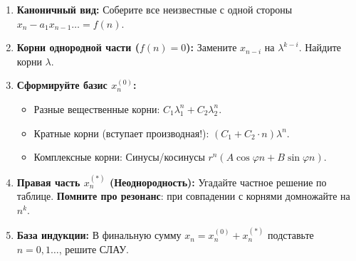 \documentclass[12pt,a4paper]{article}
\begin{document}
\vspace{0.6cm}
\begin{tcolorbox}[colback=yellow!5, colframe=orange!80!black, title=\textbf{Шпаргалка Олимпиадника: Алгоритм решения}, fonttitle=\bfseries]
\begin{enumerate}
    \item \textbf{Каноничный вид:} Соберите все неизвестные с одной стороны $x_n - a_1 x_{n-1} \dots = f(n)$.
    \item \textbf{Корни однородной части ($f(n)=0$):} Замените $x_{n-i}$ на $\lambda^{k-i}$. Найдите корни $\lambda$.
    \item \textbf{Сформируйте базис $x_n^{(0)}$:}
    \begin{itemize}
        \item Разные вещественные корни: $C_1 \lambda_1^n + C_2 \lambda_2^n$.
        \item Кратные корни (вступает производная!): $(C_1 + C_2 \cdot n) \lambda^n$.
        \item Комплексные корни: Синусы/косинусы $r^n (A \cos \varphi n + B \sin \varphi n)$.
    \end{itemize}
    \item \textbf{Правая часть $x_n^{(*)}$ (Неоднородность):} Угадайте частное решение по таблице. \textbf{Помните про резонанс}: при совпадении с корнями домножайте на $n^k$.
    \item \textbf{База индукции:} В финальную сумму $x_n = x_n^{(0)} + x_n^{(*)}$ подставьте $n=0, 1 \dots$, решите СЛАУ.
\end{enumerate}
\end{tcolorbox}
\end{document}
